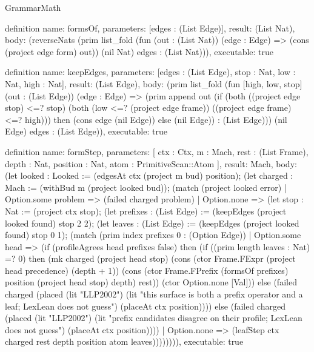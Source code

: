 \begin{lexlean}{GrammarMath}
\begin{semanticmodule}
{{{definition{
  name: formsOf,
  parameters: [edges : (List Edge)],
  result: (List Nat),
  body: (reverseNats (prim list_fold (fun (out : (List Nat)) (edge : Edge) => (cons (project edge form) out)) (nil Nat) edges : (List Nat))),
  executable: true
}

definition{
  name: keepEdges,
  parameters: [edges : (List Edge), stop : Nat, low : Nat, high : Nat],
  result: (List Edge),
  body: (prim list_fold (fun [high, low, stop] (out : (List Edge)) (edge : Edge) => (prim append out (if (both ((project edge stop) <=? stop) (both (low <=? (project edge frame)) ((project edge frame) <=? high))) then (cons edge (nil Edge)) else (nil Edge)) : (List Edge))) (nil Edge) edges : (List Edge)),
  executable: true
}

definition{
  name: formStep,
  parameters: [
    ctx : Ctx,
    m : Mach,
    rest : (List Frame),
    depth : Nat,
    position : Nat,
    atom : PrimitiveScan::Atom
  ],
  result: Mach,
  body: (let looked : Looked := (edgesAt ctx (project m bud) position); (let charged : Mach := (withBud m (project looked bud)); (match (project looked error)
    | Option.some problem => (failed charged problem)
    | Option.none => (let stop : Nat := (project ctx stop); (let prefixes : (List Edge) := (keepEdges (project looked found) stop 2 2); (let leaves : (List Edge) := (keepEdges (project looked found) stop 0 1); (match (prim index prefixes 0 : (Option Edge))
      | Option.some head => (if (profileAgrees head prefixes false) then (if ((prim length leaves : Nat) =? 0) then (mk charged (project head stop) (cons (ctor Frame.FExpr (project head precedence) (depth + 1)) (cons (ctor Frame.FPrefix (formsOf prefixes) position (project head stop) depth) rest)) (ctor Option.none [Val])) else (failed charged (placed (lit "LLP2002") (lit "this surface is both a prefix operator and a leaf; LexLean does not guess") (placeAt ctx position)))) else (failed charged (placed (lit "LLP2002") (lit "prefix candidates disagree on their profile; LexLean does not guess") (placeAt ctx position))))
      | Option.none => (leafStep ctx charged rest depth position atom leaves)))))))),
  executable: true
}

}}}
\end{semanticmodule}
\end{lexlean}
